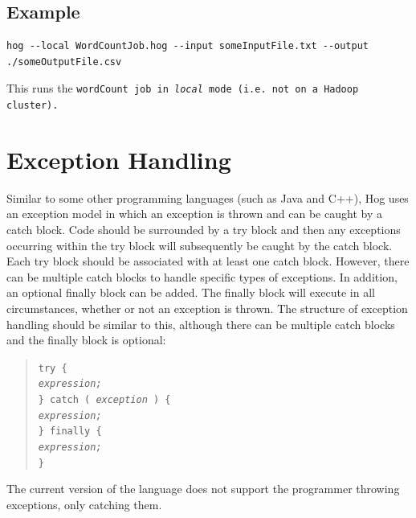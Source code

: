 \documentclass{book}
\begin{document}
\subsection{Example} %
\label{sub:example}

\begin{verbatim}
hog --local WordCountJob.hog --input someInputFile.txt --output ./someOutputFile.csv
\end{verbatim}

This runs the \tt wordCount \rm job in \emph{local} mode (i.e. not on a Hadoop
cluster).



\section{Exception Handling} %
\label{sec:exception_handling}

Similar to some other programming languages (such as Java and C++), Hog uses an
exception model in which an exception is thrown and can be caught by a catch
block. Code should be surrounded by a try block and then any exceptions
occurring within the try block will subsequently be caught by the catch block.
Each try block should be associated with at least one catch block. However,
there can be multiple catch blocks to handle specific types of exceptions. In
addition, an optional finally block can be added. The finally block will
execute in all circumstances, whether or not an exception is thrown. The
structure of exception handling should be similar to this, although there can
be multiple catch blocks and the finally block is optional:

\begin{quotation}
\tt try \{ \rm \\
\indent \indent \emph{expression;} \\
\tt \indent \} catch ( \rm \emph{exception} \tt ) \rm \{ \\
\indent \indent \emph{expression;} \\
\tt \indent \} finally \rm \{ \\
\indent \indent \emph{expression;} \\
\tt \indent \}
\end{quotation}

The current version of the language does not support the programmer throwing
exceptions, only catching them.
\end{document}
